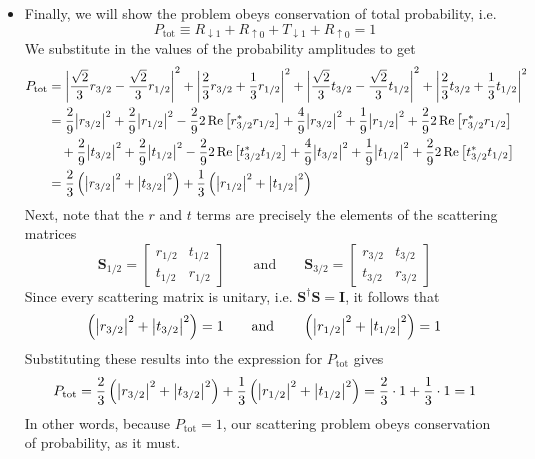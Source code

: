 \documentclass[11pt, a4paper]{article}
\newcommand{\eqtext}[1]{\qquad \text{#1} \qquad}
\newcommand{\mat}[1]{\mathbf{#1}} %
\newcommand{\ua}{\uparrow}  %
\newcommand{\da}{\downarrow}  %
\begin{document}
\begin{itemize}
	\item Finally, we will show the problem obeys conservation of total probability, i.e.
	\begin{equation*}
		P_{\text{tot}} \equiv R_{\da 1} + R_{\ua 0} + T_{\da 1} + R_{\ua 0} = 1
	\end{equation*}
	We substitute in the values of the probability amplitudes to get
	\begin{align*}
		P_{\text{tot}} &= \abs{\frac{\sqrt{2}}{3}r_{3/2} - \frac{\sqrt{2}}{3}r_{1/2} }^{2} + \abs{\frac{2}{3}r_{3/2} + \frac{1}{3}r_{1/2}}^{2} + \abs{\frac{\sqrt{2}}{3}t_{3/2} - \frac{\sqrt{2}}{3}t_{1/2} }^{2} + \abs{\frac{2}{3}t_{3/2} + \frac{1}{3}t_{1/2}}^{2}\\
		& = \frac{2}{9}\abs{r_{3/2}}^{2} + \frac{2}{9}\abs{r_{1/2}}^{2}  - \frac{2}{9} 2 \Re \big[r^{*}_{3/2}r_{1/2}\big] + \frac{4}{9}\abs{r_{3/2}}^{2} + \frac{1}{9}\abs{r_{1/2}}^{2} + \frac{2}{9} 2 \Re \big[r^{*}_{3/2}r_{1/2}\big]  \\ 
		& {}\quad + \frac{2}{9}\abs{t_{3/2}}^{2} + \frac{2}{9}\abs{t_{1/2}}^{2}  - \frac{2}{9} 2 \Re \big[t^{*}_{3/2}t_{1/2}\big] + \frac{4}{9}\abs{t_{3/2}}^{2} + \frac{1}{9}\abs{t_{1/2}}^{2} + \frac{2}{9} 2 \Re \big[t^{*}_{3/2}t_{1/2}\big] \\
		& = \frac{2}{3}\left(\abs{r_{3/2}}^{2} + \abs{t_{3/2}}^{2}\right) + \frac{1}{3}\left(\abs{r_{1/2}}^{2} + \abs{t_{1/2}}^{2}\right) 
	\end{align*}
	Next, note that the $ r $ and $ t $ terms are precisely the elements of the scattering matrices
	\begin{equation*}
		\mat{S}_{1/2} = 
		\begin{bmatrix}
			r_{1/2} & t_{1/2}\\
			t_{1/2} & r_{1/2}
		\end{bmatrix}
		\eqtext{and}
		\mat{S}_{3/2} = 
			\begin{bmatrix}
				r_{3/2} & t_{3/2}\\
				t_{3/2} & r_{3/2}
			\end{bmatrix}
	\end{equation*}
	Since every scattering matrix is unitary, i.e. $ \mat{S}^{\dagger}\mat{S} = \mat{I} $, it follows that 
	\begin{equation*}
		 \left(\abs{r_{3/2}}^{2} + \abs{t_{3/2}}^{2}\right) = 1  \eqtext{and}
		 \left(\abs{r_{1/2}}^{2} + \abs{t_{1/2}}^{2}\right) = 1
	\end{equation*}
 	Substituting these results into the expression for $ P_{\text{tot}} $ gives
	\begin{equation*}
		P_{\text{tot}} = \frac{2}{3}\left(\abs{r_{3/2}}^{2} + \abs{t_{3/2}}^{2}\right) + \frac{1}{3}\left(\abs{r_{1/2}}^{2} + \abs{t_{1/2}}^{2}\right) = \frac{2}{3}\cdot 1 +  \frac{1}{3}\cdot 1 = 1
	\end{equation*}
	In other words, because $ P_{\text{tot}} = 1 $, our scattering problem obeys conservation of probability, as it must.


	
\end{itemize}
\end{document}

